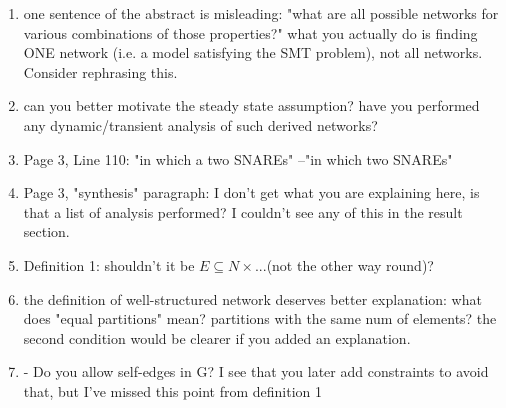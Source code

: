 \documentclass{llncs}
\begin{document}
\begin{enumerate}
\item one sentence of the abstract is misleading: "what are all possible networks for
various combinations of those properties?" what you actually do is finding ONE
network (i.e. a model satisfying the SMT problem), not all networks. Consider
rephrasing this.\newline
{}
{\color{red}{Ashutosh.}}\\

\item can you better motivate the steady state assumption? have you performed any
dynamic/transient analysis of such derived networks? \newline
{\color{red}{Fixed ! refer updated draft.}}\\

\item Page 3, Line 110: "in which a two SNAREs" --"in which two SNAREs" \newline{\color{red}{Fixed!}}\\

\item  Page 3, "synthesis" paragraph: I don't get what you are explaining here, is that a list of analysis performed? I couldn't see any of this in the result section. \newline
{\color{red}{Fixed! See updated draft}}\\

\item Definition 1: shouldn't it be $E \subseteq N \times ... $(not the other way round)? \newline
{\color{red}{Ashutosh}}\\

\item the definition of well-structured network deserves better explanation: what does
"equal partitions" mean? partitions with the same num of elements? the second
condition would be clearer if you added an explanation.\newline
{\color{red}{Ashutosh}}\\

\item -  Do you allow self-edges in G? I see that you later add constraints to avoid that, but I've missed this point from definition 1\newline
{\color{red}{Ankit, Ashutosh}}\\


\end{enumerate}
\end{document}

